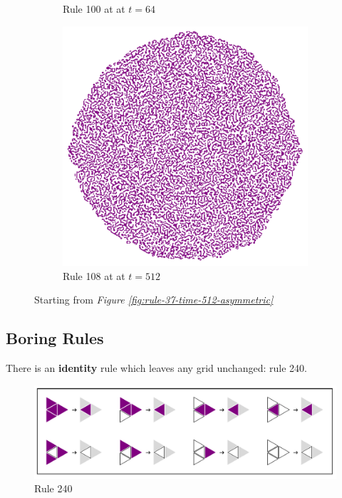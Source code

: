 \documentclass{article}
\begin{document}
\begin{figure}[H]
\begin{subfigure}[b]{0.49\textwidth}
        \caption{Rule 100 at at $t=64$}
        \label{fig:rule-100-time-64-noise}
    \end{subfigure}
    \begin{subfigure}[b]{0.49\textwidth}
        \centering
        \includegraphics[width=\textwidth]{graphics/behavior/textures/rule-108-time-512-noise.pdf}
        \caption{Rule 108 at at $t=512$}
        \label{fig:rule-108-time-512-noise}
    \end{subfigure}
        \vspace{-10pt}
       \caption{Starting from \textit{Figure \ref{fig:rule-37-time-512-asymmetric}}}
       \label{fig:textures}
\end{figure}


\pagebreak
\subsection{Boring Rules} \label{boring-rules}
\noindent There is an \textbf{identity} rule which leaves any grid unchanged: rule 240.
\begin{figure}[H]
    \centering
        \includegraphics[width=.5\textwidth]{graphics/behavior/boring-rules/rule-240.pdf}
    \caption{Rule 240}
    \label{fig:rule-plot-240}
\end{figure}
\end{document}
